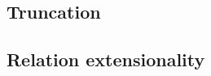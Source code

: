 \subsection{Truncation}\label{sec:trunc-sets-prop}


\subsection{Relation extensionality}\label{sec:relation-extensionality}

